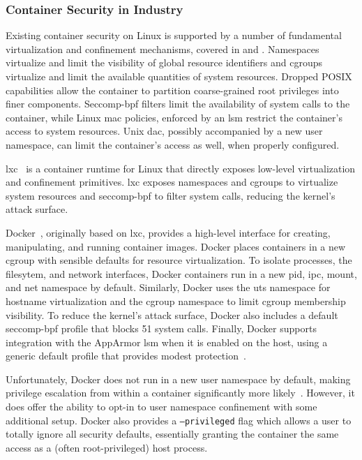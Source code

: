 \subsubsection{Container Security in Industry}%
\label{sss:container-security-industry}

Existing container security on Linux is supported by a number of fundamental
virtualization and confinement mechanisms, covered in  and
. Namespaces virtualize and limit the visibility of global
resource identifiers and cgroups virtualize and limit the available quantities of system
resources. Dropped POSIX capabilities allow the container to partition coarse-grained root
privileges into finer components. Seccomp-bpf filters limit the availability of system
calls to the container, while Linux \gls{mac} policies, enforced by an \gls{lsm} restrict
the container's access to system resources. Unix \gls{dac}, possibly accompanied by a new
user namespace, can limit the container's access as well, when properly configured.

\gls{lxc}~\cite{lxc_security} is a container runtime for Linux that directly exposes
low-level virtualization and confinement primitives. \gls{lxc} exposes namespaces and
cgroups to virtualize system resources and seccomp-bpf to filter system calls, reducing
the kernel's attack surface.

Docker~\cite{docker_security, bui2015_docker_analysis, combe2016_to_docker}, originally
based on \gls{lxc}, provides a high-level interface for creating, manipulating, and
running container images. Docker places containers in a new cgroup with sensible defaults
for resource virtualization. To isolate processes, the filesytem, and network interfaces,
Docker containers run in a new \gls{pid}, \gls{ipc}, mount, and net
namespace by default.  Similarly, Docker uses the \gls{uts} namespace for hostname
virtualization and the cgroup namespace to limit cgroup membership visibility. To
reduce the kernel's attack surface, Docker also includes a default seccomp-bpf profile
that blocks 51 system calls. Finally, Docker supports integration with the AppArmor
\gls{lsm} when it is enabled on the host, using a generic default profile that provides
modest protection~\cite{docker_apparmor, docker_default_apparmor}.

Unfortunately, Docker does not run in a new user namespace by default, making privilege
escalation from within a container significantly more likely~\cite{docker_security}.
However, it does offer the ability to opt-in to user namespace confinement with some
additional setup.  Docker also provides a \texttt{--privileged} flag which allows a user
to totally ignore all security defaults, essentially granting the container the same
access as a (often root-privileged) host process.

